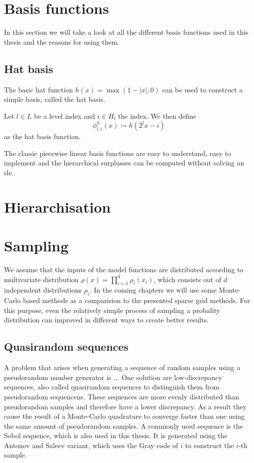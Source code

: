 \documentclass[
  a4paper,  %
  twoside,  %
  bibliography=totoc,
  headsepline,
  cleardoublepage=empty,
  parskip=half,
  draft=false
]{scrbook}
\begin{document}
\section{Basis functions}

In this section we will take a look at all the different basis functions used in this thesis and the reasons for using them.

\subsection{Hat basis}

The basic hat function $h(x)=\max(1 - |x|,0)$ can be used to construct a simple basis, called the hat basis.
\begin{definition}
Let $l \in L$ be a level index and $i \in H_l$ the index.
We then define
\begin{equation}
\phi^h_{l,i}(x) \coloneqq h(2^lx-i)
\end{equation}
as the hat basis function.
\end{definition}
The classic piecewise linear basis functions are easy to understand, easy to implement and the hierarchical surplusses can be computed without solving an sle.

\section{Hierarchisation}

\section{Sampling}

We assume that the inputs of the model functions are distributed according to multivariate distribution $\rho(x)=\prod_{i=1}^d \rho_i(x_i)$, which consists out of $d$ independent distributions $\rho_i$.
In the coming chapters we will use some Monte-Carlo based methods as a comparision to the presented sparse grid methods.
For this purpose, even the relatively simple process of sampling a probality distribution can improved in different ways to create better results.

\subsection{Quasirandom sequences}

A problem that arises when generating a sequence of random samples using a pseudorandom number generator is ...
One solution are low-discrepancy sequences, also called quasirandom sequences to distinguish them from pseudorandom sequencens.
These sequences are more evenly distributed than pseudorandom samples and therefore have a lower discrepancy.
As a result they cause the result of a Monte-Carlo quadrature to converge faster than one using the same amount of pseudorandom samples.
A commonly used sequence is the Sobol sequence, which is also used in this thesis.
It is generated using the Antonov and Saleev variant, which uses the Gray code of $i$ to construct the $i$-th sample.
\end{document}

